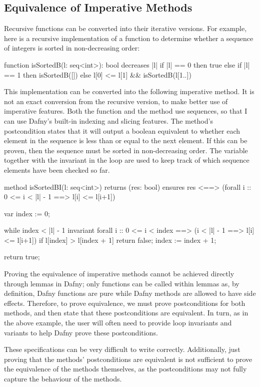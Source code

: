 \subsection{Equivalence of Imperative Methods}\label{sec:imperative-equivalence}

Recursive functions can be converted into their iterative versions. For example, here is a recursive implementation of a function  to determine whether a sequence of integers is sorted in non-decreasing order:
\begin{dafny}
function isSortedB(l: seq<int>): bool
  decreases |l|
{
  if |l| == 0 then true
  else if |l| == 1 then isSortedB([])
  else l[0] <= l[1] && isSortedB(l[1..])
}
\end{dafny}
%
This implementation can be converted into the following imperative method. It is not an exact conversion from the recursive version, to make better use of imperative features. Both the function and the method use sequences, so that I can use Dafny's built-in indexing and slicing features. The method's postcondition states that it will output a boolean equivalent to whether each element in the sequence is less than or equal to the next element. If this can be proven, then the sequence must be sorted in non-decreasing order. The variable  together with the invariant in the  loop are used to keep track of which sequence elements have been checked so far.
\begin{dafny}
method isSortedBI(l: seq<int>) returns (res: bool)
  ensures res <==> (forall i :: 0 <= i < |l| - 1 ==> l[i] <= l[i+1])
{
  var index := 0;

  while index < |l| - 1
    invariant forall i :: 0 <= i < index ==> (i < |l| - 1 ==> l[i] <= l[i+1])
  {
    if l[index] > l[index + 1] {
        return false;
    }
    index := index + 1;
  }

  return true;
}
\end{dafny}
%
Proving the equivalence of imperative methods cannot be achieved directly through lemmas in Dafny; only functions can be called within lemmas as, by definition, Dafny functions are pure while Dafny methods are allowed to have side effects. Therefore, to prove equivalence, we must prove postconditions for both methods, and then state that these postconditions are equivalent. In turn, as in the above example, the user will often need to provide loop invariants and variants to help Dafny prove these postconditions.

These specifications can be very difficult to write correctly. Additionally, just proving that the methods' postconditions are equivalent is not sufficient to prove the equivalence of the methods themselves, as the postconditions may not fully capture the behaviour of the methods. 

